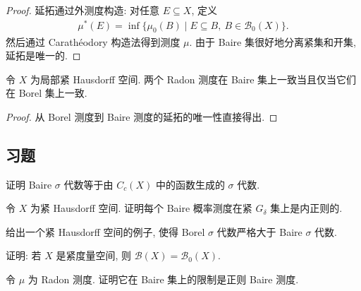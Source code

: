 \documentclass[../../main.tex]{subfiles}
\begin{document}
\begin{proof}
延拓通过外测度构造: 对任意 $E\subseteq X$, 定义
\begin{align*}
\mu^{*}(E)=\inf\{\mu_{0}(B)\mid E\subseteq B,\ B\in\mathcal{B}_{0}(X)\}.
\end{align*}
然后通过 Carath\'eodory 构造法得到测度 $\mu$. 由于 Baire 集很好地分离紧集和开集, 延拓是唯一的.
\end{proof}

\begin{corollary}\label{corollary:ch21-唯一延拓}
令 $X$ 为局部紧 Hausdorff 空间. 两个 Radon 测度在 Baire 集上一致当且仅当它们在 Borel 集上一致.
\end{corollary}

\begin{proof}
从 Borel 测度到 Baire 测度的延拓的唯一性直接得出.
\end{proof}

\subsection*{习题}

\begin{exercise}\label{exercise:ch21-35}
证明 Baire $\sigma$ 代数等于由 $C_{c}(X)$ 中的函数生成的 $\sigma$ 代数.
\end{exercise}

\begin{exercise}\label{exercise:ch21-36}
令 $X$ 为紧 Hausdorff 空间. 证明每个 Baire 概率测度在紧 $G_{\delta}$ 集上是内正则的.
\end{exercise}

\begin{exercise}\label{exercise:ch21-37}
给出一个紧 Hausdorff 空间的例子, 使得 Borel $\sigma$ 代数严格大于 Baire $\sigma$ 代数.
\end{exercise}

\begin{exercise}\label{exercise:ch21-38}
证明: 若 $X$ 是紧度量空间, 则 $\mathcal{B}(X)=\mathcal{B}_{0}(X)$.
\end{exercise}

\begin{exercise}\label{exercise:ch21-39}
令 $\mu$ 为 Radon 测度. 证明它在 Baire 集上的限制是正则 Baire 测度.
\end{exercise}
\end{document}
